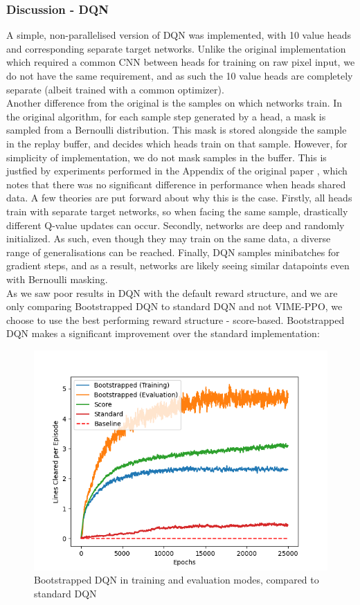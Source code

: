 \documentclass[12pt]{article}
\begin{document}
\subsubsection{Discussion - DQN}\label{bootdqn}
A simple, non-parallelised version of DQN was implemented, with 10 value heads and corresponding separate target networks. Unlike the original implementation which required a common CNN between heads for training on raw pixel input, we do not have the same requirement, and as such the 10 value heads are completely separate (albeit trained with a common optimizer). \\\newline
Another difference from the original is the samples on which networks train. In the original algorithm, for each sample step generated by a head, a mask is sampled from a Bernoulli distribution. This mask is stored alongside the sample in the replay buffer, and decides which heads train on that sample. However, for simplicity of implementation, we do not mask samples in the buffer. This is justfied by experiments performed in the Appendix of the original paper \autocite{osband2016deep}, which notes that there was no significant difference in performance when heads shared data. A few theories are put forward about why this is the case. Firstly, all heads train with separate target networks, so when facing the same sample, drastically different Q-value updates can occur. Secondly, networks are deep and randomly initialized. As such, even though they may train on the same data, a diverse range of generalisations can be reached. Finally, DQN samples minibatches for gradient steps, and as a result, networks are likely seeing similar datapoints even with Bernoulli masking.\\\newline
As we saw poor results in DQN with the default reward structure, and we are only comparing Bootstrapped DQN to standard DQN and not VIME-PPO, we choose to use the best performing reward structure - score-based. Bootstrapped DQN makes a significant improvement over the standard implementation: 
\begin{figure}[H]
    \centering
    \includegraphics[scale=0.7]{33.png}
    \caption{Bootstrapped DQN in training and evaluation modes, compared to standard DQN}
\end{figure}
\end{document}
